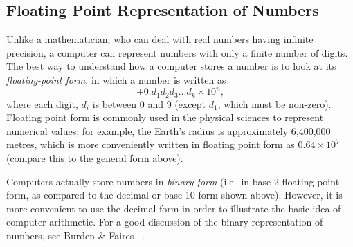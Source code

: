 \subsection{Floating Point Representation of Numbers}
\label{lab2:ap:floating-point}

Unlike a mathematician, who can deal with real numbers having infinite
precision, a computer can represent numbers with only
a finite number of digits.  
The best way to understand how a computer stores a number is to look at
its \emph{ floating-point form}, in which a number is written as
\[
\pm 0.d_1 d_2 d_3 \ldots d_k \times 10^n,
\]
where each digit, $d_i$ is between 0 and 9 (except $d_1$, which must
be non-zero).  
Floating point form is commonly used in the physical sciences to
represent numerical values; for example, the Earth's radius is
approximately 6,400,000 metres, which is more conveniently written in
floating point form as $0.64\times 10^7$ (compare this to the general
form above).

\begin{note}
  Computers actually store numbers in \emph{ binary form} (i.e.\ in
  base-2 floating point form, as compared to the decimal or base-10 
  form shown above).  However, it is more convenient to use the
  decimal form in order to illustrate the basic idea of computer
  arithmetic.  For a good discussion of the binary representation of
  numbers, see Burden \& Faires ~\cite[sec.~1.2]{burden-faires}.  
\end{note}

